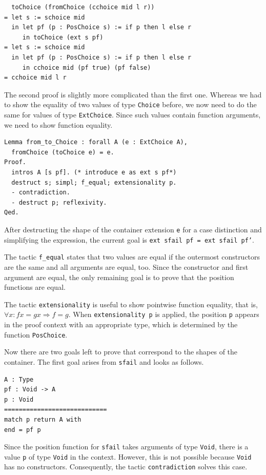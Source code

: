 \documentclass[a4paper, 11pt, fleqn, twoside, abstract=on]{scrreprt}
\newcommand{\cinl}[1]{\texttt{#1}}
\begin{document}
\begin{verbatim}
  toChoice (fromChoice (cchoice mid l r))
= let s := schoice mid
  in let pf (p : PosChoice s) := if p then l else r
     in toChoice (ext s pf)
= let s := schoice mid
  in let pf (p : PosChoice s) := if p then l else r
     in cchoice mid (pf true) (pf false)
= cchoice mid l r
\end{verbatim}

The second proof is slightly more complicated than the first one.
Whereas we had to show the equality of two values of type \cinl{Choice} before, we now need to do the same for values of type \cinl{ExtChoice}.
Since such values contain function arguments, we need to show function equality.

\begin{verbatim}
Lemma from_to_Choice : forall A (e : ExtChoice A),
  fromChoice (toChoice e) = e.
Proof.
  intros A [s pf]. (* introduce e as ext s pf*)
  destruct s; simpl; f_equal; extensionality p.
  - contradiction.
  - destruct p; reflexivity.
Qed. 
\end{verbatim}
\noindent
After destructing the shape of the container extension \cinl{e} for a case distinction and simplifying the expression, the current goal is \cinl{ext sfail pf = ext sfail pf'}.

The tactic \cinl{f_equal} states that two values are equal if the outermost constructors are the same and all arguments are equal, too.
Since the constructor and first argument are equal, the only remaining goal is to prove that the position functions are equal.

The tactic \cinl{extensionality} is useful to show pointwise function equality, that is, $\forall x: f x = g x \Rightarrow f = g$.
When \cinl{extensionality p} is applied, the position \cinl{p} appears in the proof context with an appropriate type, which is determined by the function \cinl{PosChoice}.

Now there are two goals left to prove that correspond to the shapes of the container.
The first goal arises from \cinl{sfail} and looks as follows.

\begin{verbatim}
A : Type
pf : Void -> A
p : Void
============================
match p return A with
end = pf p
\end{verbatim}
\noindent
Since the position function for \cinl{sfail} takes arguments of type \cinl{Void}, there is a value \cinl{p} of type \cinl{Void} in the context.
However, this is not possible because \cinl{Void} has no constructors.
Consequently, the tactic \cinl{contradiction} solves this case.
\end{document}
